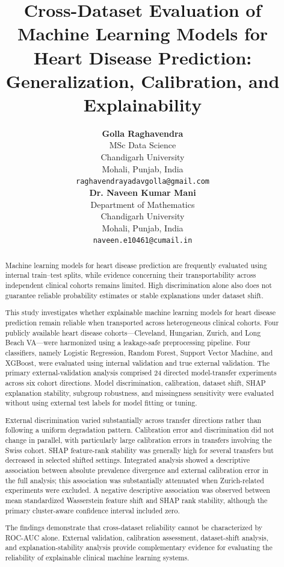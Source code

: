 \documentclass[10pt,journal,twocolumn]{IEEEtran}
\title{
Cross-Dataset Evaluation of Machine Learning Models for Heart Disease Prediction:
Generalization, Calibration, and Explainability
}
\author{
\begin{minipage}[t]{0.45\textwidth}
\centering
\textbf{Golla Raghavendra}\\
MSc Data Science\\
Chandigarh University\\
Mohali, Punjab, India\\
\texttt{raghavendrayadavgolla@gmail.com}
\end{minipage}
\hfill
\begin{minipage}[t]{0.45\textwidth}
\centering
\textbf{Dr. Naveen Kumar Mani}\\
Department of Mathematics\\
Chandigarh University\\
Mohali, Punjab, India\\
\texttt{naveen.e10461@cumail.in}
\end{minipage}
}
\begin{document}
\maketitle


\begin{abstract}

Machine learning models for heart disease prediction are frequently evaluated using internal train--test splits, while evidence concerning their transportability across independent clinical cohorts remains limited. High discrimination alone also does not guarantee reliable probability estimates or stable explanations under dataset shift.

This study investigates whether explainable machine learning models for heart disease prediction remain reliable when transported across heterogeneous clinical cohorts. Four publicly available heart disease cohorts---Cleveland, Hungarian, Zurich, and Long Beach VA---were harmonized using a leakage-safe preprocessing pipeline. Four classifiers, namely Logistic Regression, Random Forest, Support Vector Machine, and XGBoost, were evaluated using internal validation and true external validation. The primary external-validation analysis comprised 24 directed model-transfer experiments across six cohort directions. Model discrimination, calibration, dataset shift, SHAP explanation stability, subgroup robustness, and missingness sensitivity were evaluated without using external test labels for model fitting or tuning.

External discrimination varied substantially across transfer directions rather than following a uniform degradation pattern. Calibration error and discrimination did not change in parallel, with particularly large calibration errors in transfers involving the Swiss cohort. SHAP feature-rank stability was generally high for several transfers but decreased in selected shifted settings. Integrated analysis showed a descriptive association between absolute prevalence divergence and external calibration error in the full analysis; this association was substantially attenuated when Zurich-related experiments were excluded. A negative descriptive association was observed between mean standardized Wasserstein feature shift and SHAP rank stability, although the primary cluster-aware confidence interval included zero.

The findings demonstrate that cross-dataset reliability cannot be characterized by ROC-AUC alone. External validation, calibration assessment, dataset-shift analysis, and explanation-stability analysis provide complementary evidence for evaluating the reliability of explainable clinical machine learning systems.

\end{abstract}
\end{document}
